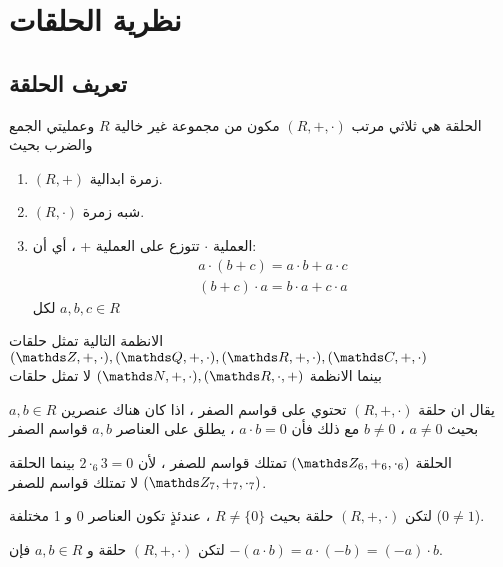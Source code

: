 \chapter{نظرية الحلقات}

\section{تعريف الحلقة}

\begin{definition}
	الحلقة هي ثلاثي مرتب $(R, +, \cdot)$ مكون من مجموعة غير خالية $R$ وعمليتي الجمع والضرب بحيث 
	\begin{enumerate}[label=$\boxed{\arabic*}$]
		\item $(R, +)$ زمرة ابدالية.
		\item  $(R, \cdot) $ شبه زمرة.
		\item العملية $\cdot$ تتوزع على العملية + ، أي أن:
	\begin{gather*}
				a\cdot (b+c) = a\cdot b + a\cdot c \tag{التوزيع من اليسار}\\
				(b + c) \cdot a = b\cdot a + c\cdot a \tag{التوزيع من اليمين}
	\end{gather*}
	لكل $a ,b,c\in R$
	\end{enumerate}
\end{definition}

\begin{example}
	الانظمة التالية تمثل حلقات
	$
	(\Z, + ,\cdot), (\Q, + ,\cdot),(\R, + ,\cdot),(\C, + ,\cdot)
	$\\
	بينما الانظمة 
	$
	(\N, +, \cdot), (\R, \cdot, +)
	$
	لا تمثل حلقات
\end{example}

\begin{definition}
	يقال ان حلقة $(R, +, \cdot)$ تحتوي على قواسم الصفر ، اذا كان هناك عنصرين $a, b\in R$ بحيث $a\neq 0$ ، $b\neq 0$ مع ذلك فأن $a\cdot b=0$ ، يطلق على العناصر $a,b$ قواسم الصفر
\end{definition}

\begin{example}
	الحلقة
	 $(\Z_6, +_6, \cdot_6)$ تمتلك قواسم للصفر ، لأن $2\cdot_6 3=0 $ بينما الحلقة 
	$(\Z_7, +_7, \cdot_7)$ لا تمتلك قواسم للصفر.
\end{example}

\begin{theorem}
	لتكن $(R, +, \cdot)$ حلقة بحيث $R\neq \{0\}$ ، عندئذٍ تكون العناصر 0 و 1 مختلفة ($0\neq 1$).
\end{theorem}

\begin{theorem}
	لتكن $(R, +, \cdot)$ حلقة و $a,b\in R$ فإن 
	$-(a\cdot b) = a\cdot (-b) = (-a)\cdot b$.
\end{theorem}

